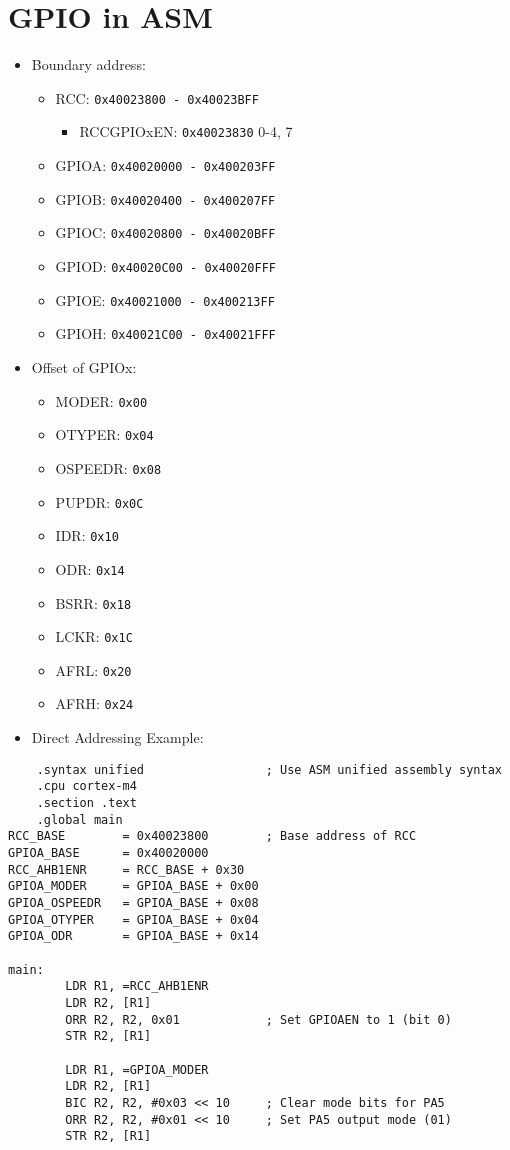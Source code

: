 \documentclass[a4paper,12pt,openany]{book}
\begin{document}
\section{GPIO in ASM}
\begin{itemize}
    \item Boundary address:
    \begin{itemize}
        \item RCC: \texttt{0x40023800 - 0x40023BFF}
        \begin{itemize}
            \item RCCGPIOxEN: \texttt{0x40023830} 0-4, 7
        \end{itemize}
        \item GPIOA: \texttt{0x40020000 - 0x400203FF}
        \item GPIOB: \texttt{0x40020400 - 0x400207FF}
        \item GPIOC: \texttt{0x40020800 - 0x40020BFF}
        \item GPIOD: \texttt{0x40020C00 - 0x40020FFF}
        \item GPIOE: \texttt{0x40021000 - 0x400213FF}
        \item GPIOH: \texttt{0x40021C00 - 0x40021FFF}
    \end{itemize}
    \item Offset of GPIOx:
    \begin{itemize}
        \item MODER: \texttt{0x00}
        \item OTYPER: \texttt{0x04}
        \item OSPEEDR: \texttt{0x08}
        \item PUPDR: \texttt{0x0C}
        \item IDR: \texttt{0x10}
        \item ODR: \texttt{0x14}
        \item BSRR: \texttt{0x18}
        \item LCKR: \texttt{0x1C}
        \item AFRL: \texttt{0x20}
        \item AFRH: \texttt{0x24}
    \end{itemize}
    \item Direct Addressing Example:
\end{itemize}
\begin{verbatim}
    .syntax unified                 ; Use ASM unified assembly syntax
    .cpu cortex-m4
    .section .text
    .global main
RCC_BASE        = 0x40023800        ; Base address of RCC 
GPIOA_BASE      = 0x40020000
RCC_AHB1ENR     = RCC_BASE + 0x30
GPIOA_MODER     = GPIOA_BASE + 0x00
GPIOA_OSPEEDR   = GPIOA_BASE + 0x08
GPIOA_OTYPER    = GPIOA_BASE + 0x04
GPIOA_ODR       = GPIOA_BASE + 0x14

main:
        LDR R1, =RCC_AHB1ENR
        LDR R2, [R1]
        ORR R2, R2, 0x01            ; Set GPIOAEN to 1 (bit 0)
        STR R2, [R1]

        LDR R1, =GPIOA_MODER
        LDR R2, [R1]
        BIC R2, R2, #0x03 << 10     ; Clear mode bits for PA5
        ORR R2, R2, #0x01 << 10     ; Set PA5 output mode (01)
        STR R2, [R1]
\end{verbatim}
\end{document}
